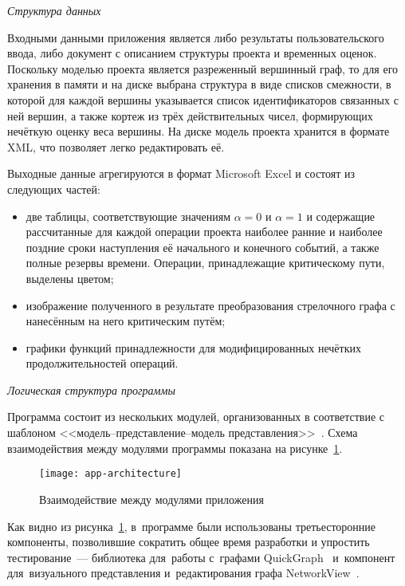\textit{Структура данных}

Входными данными приложения является либо результаты пользовательского ввода, либо документ с описанием структуры проекта и временных оценок. Поскольку моделью проекта является разреженный вершинный граф, то для его хранения в памяти и на диске выбрана структура в виде списков смежности, в которой для каждой вершины указывается список идентификаторов связанных с ней вершин, а также кортеж из трёх действительных чисел, формирующих нечёткую оценку веса вершины. На диске модель проекта хранится в формате XML, что позволяет легко редактировать её.

Выходные данные агрегируются в формат Microsoft Excel и состоят из следующих частей:
\begin{itemize}
  \item две таблицы, соответствующие значениям $\alpha=0$ и $\alpha=1$ и содержащие рассчитанные для каждой операции проекта наиболее ранние и наиболее поздние сроки наступления её начального и конечного событий, а также полные резервы времени. Операции, принадлежащие критическому пути, выделены цветом;
  \item изображение полученного в результате преобразования стрелочного графа с нанесённым на него критическим путём;
  \item графики функций принадлежности для модифицированных нечётких продолжительностей операций.
\end{itemize}

\textit{Логическая структура программы}

Программа состоит из нескольких модулей, организованных в соответствие с шаблоном <<модель--представление--модель представления>>~\cite{NetworkView_CodeProject}. Схема взаимодействия между модулями программы показана на рисунке~\ref{fig:app-architecture}.
\begin{figure}[t!]
  \centering
  {
    \texttt{[image: app-architecture]}
  }
  \caption{Взаимодействие между модулями приложения}
  \label{fig:app-architecture}
\end{figure}

Как видно из рисунка~\ref{fig:app-architecture}, в~программе были использованы третьесторонние компоненты, позволившие сократить общее время разработки и упростить тестирование~--- библиотека для~работы с~графами QuickGraph~\cite{QuickGraph_Codeplex, QuickGraph_CodeProject} и~компонент для~визуального представления и~редактирования графа NetworkView~\cite{NetworkView_CodeProject}.

